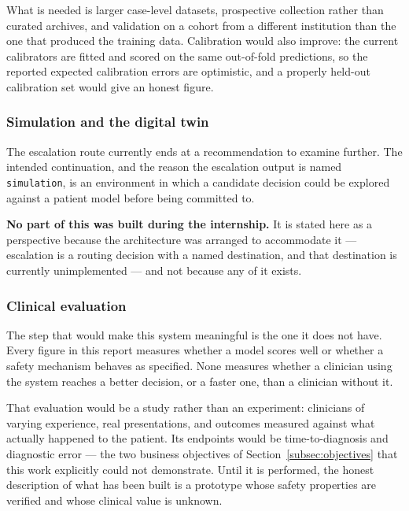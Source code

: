 What is needed is larger case-level datasets, prospective collection rather than curated
archives, and validation on a cohort from a different institution than the one that produced
the training data. Calibration would also improve: the current calibrators are fitted and scored
on the same out-of-fold predictions, so the reported expected calibration errors are optimistic,
and a properly held-out calibration set would give an honest figure.

\subsubsection{Simulation and the digital twin}

The escalation route currently ends at a recommendation to examine further. The intended
continuation, and the reason the escalation output is named \texttt{simulation}, is an
environment in which a candidate decision could be explored against a patient model before being
committed to.

\textbf{No part of this was built during the internship.} It is stated here as a perspective
because the architecture was arranged to accommodate it --- escalation is a routing decision
with a named destination, and that destination is currently unimplemented --- and not because
any of it exists.

\subsubsection{Clinical evaluation}

The step that would make this system meaningful is the one it does not have. Every figure in
this report measures whether a model scores well or whether a safety mechanism behaves as
specified. None measures whether a clinician using the system reaches a better decision, or a
faster one, than a clinician without it.

That evaluation would be a study rather than an experiment: clinicians of varying experience,
real presentations, and outcomes measured against what actually happened to the patient. Its
endpoints would be time-to-diagnosis and diagnostic error --- the two business objectives of
Section~\ref{subsec:objectives} that this work explicitly could not demonstrate. Until it is
performed, the honest description of what has been built is a prototype whose safety properties
are verified and whose clinical value is unknown.
